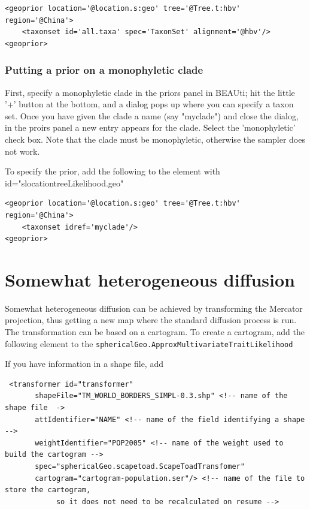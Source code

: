 \documentclass{article}
\begin{document}
\begin{verbatim}
<geoprior location='@location.s:geo' tree='@Tree.t:hbv' region='@China'>
	<taxonset id='all.taxa' spec='TaxonSet' alignment='@hbv'/>
<geoprior>
\end{verbatim}


\subsubsection*{Putting a prior on a monophyletic clade}

First, specify a monophyletic clade in the priors panel in BEAUti; hit the little '+' button at the bottom, and a dialog pops up where you can specify a taxon set. Once you have given the clade a name (say "myclade") and close the dialog, in the proirs panel a new entry appears for the clade. Select the 'monophyletic' check box. Note that the clade must be monophyletic, otherwise the sampler does not work.

To specify the prior, add the following to the element with id="slocationtreeLikelihood.geo"

\begin{verbatim}
<geoprior location='@location.s:geo' tree='@Tree.t:hbv' region='@China'>
	<taxonset idref='myclade'/>
<geoprior>
\end{verbatim}


\section*{Somewhat heterogeneous diffusion}

Somewhat heterogeneous diffusion can be achieved by transforming the Mercator projection, thus getting a new map where the standard diffusion process is run. The transformation can be based on a cartogram. To create a cartogram, add the following element to the {\tt sphericalGeo.ApproxMultivariateTraitLikelihood}

If you have information in a shape file, add

\begin{verbatim}
 <transformer id="transformer" 
       shapeFile="TM_WORLD_BORDERS_SIMPL-0.3.shp" <!-- name of the shape file  ->
       attIdentifier="NAME" <!-- name of the field identifying a shape -->
       weightIdentifier="POP2005" <!-- name of the weight used to build the cartogram -->
       spec="sphericalGeo.scapetoad.ScapeToadTransfomer"
       cartogram="cartogram-population.ser"/> <!-- name of the file to store the cartogram, 
            so it does not need to be recalculated on resume -->
 \end{verbatim}
\end{document}
